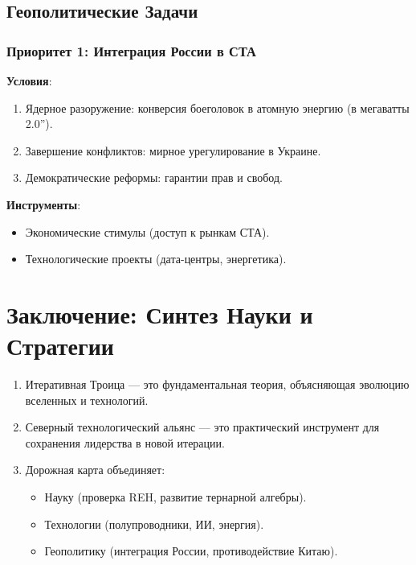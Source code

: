 \documentclass[11pt, a4paper]{article}
\begin{document}
\subsection{Геополитические Задачи}
\subsubsection*{Приоритет 1: Интеграция России в СТА}
\textbf{Условия}:
\begin{enumerate}
    \item Ядерное разоружение: конверсия боеголовок в атомную энергию ( в мегаватты 2.0\textquotedblright).
    \item Завершение конфликтов: мирное урегулирование в Украине.
    \item Демократические реформы: гарантии прав и свобод.
\end{enumerate}

\textbf{Инструменты}:
\begin{itemize}
    \item Экономические стимулы (доступ к рынкам СТА).
    \item Технологические проекты (дата-центры, энергетика).
\end{itemize}

\section*{Заключение: Синтез Науки и Стратегии}
\begin{enumerate}
    \item Итеративная Троица --- это фундаментальная теория, объясняющая эволюцию вселенных и технологий.
    \item Северный технологический альянс --- это практический инструмент для сохранения лидерства в новой итерации.
    \item Дорожная карта объединяет:
    \begin{itemize}
        \item Науку (проверка REH, развитие тернарной алгебры).
        \item Технологии (полупроводники, ИИ, энергия).
        \item Геополитику (интеграция России, противодействие Китаю).
    \end{itemize}
\end{enumerate}
\end{document}

